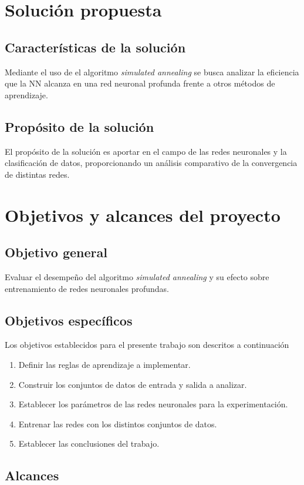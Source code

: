 \section{Solución propuesta}
\subsection{Características de la solución}
Mediante el uso de el algoritmo {\em simulated annealing} se busca analizar la eficiencia que la NN alcanza en una red neuronal profunda frente a otros métodos de aprendizaje.

\subsection{Propósito de la solución}
El propósito de la solución es aportar en el campo de las redes neuronales y la clasificación de datos, proporcionando un análisis comparativo de la convergencia de distintas redes.
\section{Objetivos y alcances del proyecto}
\subsection{Objetivo general}
Evaluar el desempeño del algoritmo {\em simulated annealing} y su efecto sobre entrenamiento de redes neuronales profundas.

\subsection{Objetivos específicos}
Los objetivos establecidos para el presente trabajo son descritos a continuación
\begin{enumerate}
    \item Definir las reglas de aprendizaje a implementar.
    \item Construir los conjuntos de datos de entrada y salida a analizar.
	\item Establecer los parámetros de las redes neuronales para la experimentación.
	\item Entrenar las redes con los distintos conjuntos de datos.
    \item Establecer las conclusiones del trabajo.
\end{enumerate}

\subsection{Alcances}

